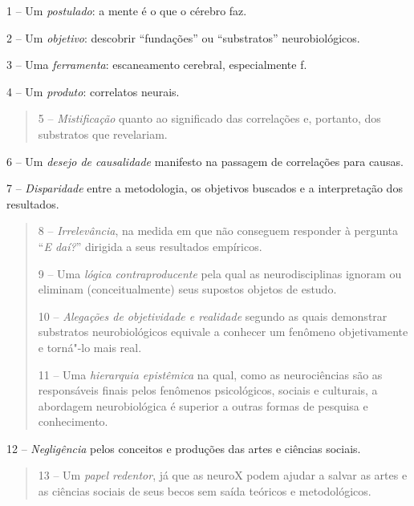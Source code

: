 1 -- Um \emph{postulado}: a mente é o que o cérebro faz.

2 -- Um \emph{objetivo}: descobrir ``fundações'' ou ``substratos''
neurobiológicos.

3 -- Uma \emph{ferramenta}: escaneamento cerebral, especialmente f.

4 -- Um \emph{produto}: correlatos neurais.

\begin{quote}
5 -- \emph{Mistificação} quanto ao significado das correlações e,
portanto, dos substratos que revelariam.
\end{quote}

6 -- Um \emph{desejo de causalidade} manifesto na passagem de
correlações para causas.

7 -- \emph{Disparidade} entre a metodologia, os objetivos buscados e a
interpretação dos resultados.

\begin{quote}
8 -- \emph{Irrelevância}, na medida em que não conseguem responder à
pergunta ``\emph{E daí?}'' dirigida a seus resultados empíricos.

9 -- Uma \emph{lógica contraproducente} pela qual as neurodisciplinas
ignoram ou eliminam (conceitualmente) seus supostos objetos de estudo.

10 -- \emph{Alegações de objetividade e realidade} segundo as quais
demonstrar substratos neurobiológicos equivale a conhecer um fenômeno
objetivamente e torná"-lo mais real.

11 -- Uma \emph{hierarquia epistêmica} na qual, como as neurociências
são as responsáveis finais pelos fenômenos psicológicos, sociais e
culturais, a abordagem neurobiológica é superior a outras formas de
pesquisa e conhecimento.
\end{quote}

12 -- \emph{Negligência} pelos conceitos e produções das artes e
ciências sociais.

\begin{quote}
13 -- Um \emph{papel redentor}, já que as neuroX podem ajudar a salvar
as artes e as ciências sociais de seus becos sem saída teóricos e
metodológicos.
\end{quote}

